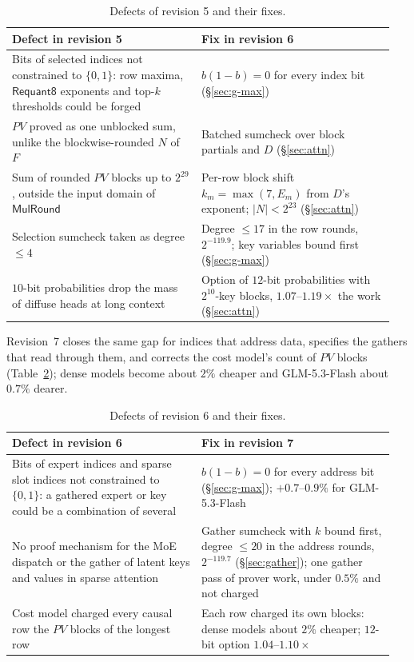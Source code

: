\documentclass[11pt]{article}
\begin{document}
\begin{table}[h]
\centering\small
\begin{tabular}{@{}p{0.47\linewidth}p{0.48\linewidth}@{}}
\toprule
Defect in revision 5 & Fix in revision 6 \\
\midrule
Bits of selected indices not constrained to \(\{0,1\}\): row maxima, \(\mathsf{Requant8}\) exponents and top-\(k\) thresholds could be forged & \(b(1-b) = 0\) for every index bit (\S\ref{sec:g-max}) \\
\(PV\) proved as one unblocked sum, unlike the blockwise-rounded \(N\) of \(F\) & Batched sumcheck over block partials and \(D\) (\S\ref{sec:attn}) \\
Sum of rounded \(PV\) blocks up to \(2^{29}\), outside the input domain of \(\mathsf{MulRound}\) & Per-row block shift \(k_m = \max(7, E_m)\) from \(D\)'s exponent; \(|N| < 2^{23}\) (\S\ref{sec:attn}) \\
Selection sumcheck taken as degree \(\le 4\) & Degree \(\le 17\) in the row rounds, \(2^{-119.9}\); key variables bound first (\S\ref{sec:g-max}) \\
\(10\)-bit probabilities drop the mass of diffuse heads at long context & Option of \(12\)-bit probabilities with \(2^{10}\)-key blocks, \(1.07\)--\(1.19\times\) the work (\S\ref{sec:attn}) \\
\bottomrule
\end{tabular}
\caption{Defects of revision 5 and their fixes.}
\label{tab:rev6}
\end{table}

Revision~7 closes the same gap for indices that address data, specifies the gathers that read through them, and corrects the cost model's count of \(PV\) blocks (Table~\ref{tab:rev7}); dense models become about \(2\%\) cheaper and GLM-5.3-Flash about \(0.7\%\) dearer.

\begin{table}[h]
\centering\small
\begin{tabular}{@{}p{0.47\linewidth}p{0.48\linewidth}@{}}
\toprule
Defect in revision 6 & Fix in revision 7 \\
\midrule
Bits of expert indices and sparse slot indices not constrained to \(\{0,1\}\): a gathered expert or key could be a combination of several & \(b(1-b) = 0\) for every address bit (\S\ref{sec:g-max}); \(+0.7\)--\(0.9\%\) for GLM-5.3-Flash \\
No proof mechanism for the MoE dispatch or the gather of latent keys and values in sparse attention & Gather sumcheck with \(k\) bound first, degree \(\le 20\) in the address rounds, \(2^{-119.7}\) (\S\ref{sec:gather}); one gather pass of prover work, under \(0.5\%\) and not charged \\
Cost model charged every causal row the \(PV\) blocks of the longest row & Each row charged its own blocks: dense models about \(2\%\) cheaper; \(12\)-bit option \(1.04\)--\(1.10\times\) \\
\bottomrule
\end{tabular}
\caption{Defects of revision 6 and their fixes.}
\label{tab:rev7}
\end{table}
\end{document}
